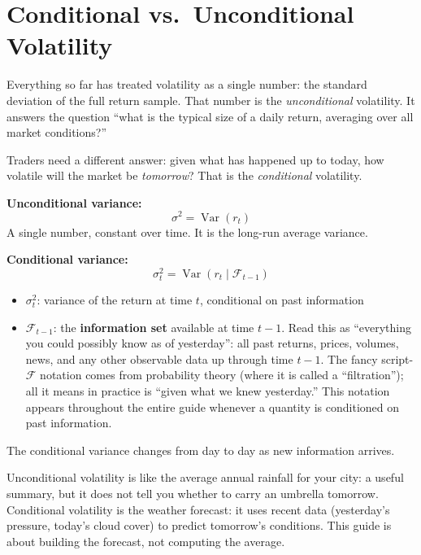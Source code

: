 \section{Conditional vs.\ Unconditional Volatility}
\label{sec:cond-uncond}

Everything so far has treated volatility as a single number: the standard deviation of the full return sample.
That number is the \emph{unconditional} volatility.
It answers the question ``what is the typical size of a daily return, averaging over all market conditions?''

Traders need a different answer: given what has happened up to today, how volatile will the market be \emph{tomorrow}?
That is the \emph{conditional} volatility.

\begin{definition}
\textbf{Unconditional variance:}
\begin{equation}
  \sigma^2 = \operatorname{Var}(r_t)
  \label{eq:uncond-var}
\end{equation}
A single number, constant over time. It is the long-run average variance.

\textbf{Conditional variance:}
\begin{equation}
  \sigma_t^2 = \operatorname{Var}(r_t \mid \mathcal{F}_{t-1})
  \label{eq:cond-var}
\end{equation}
\begin{itemize}[nosep]
  \item $\sigma_t^2$: variance of the return at time $t$, conditional on past information
  \item $\mathcal{F}_{t-1}$: the \textbf{information set} available at time $t-1$.
  Read this as ``everything you could possibly know as of yesterday'': all past returns, prices, volumes, news, and any other observable data up through time $t-1$.
  The fancy script-$\mathcal{F}$ notation comes from probability theory (where it is called a ``filtration''); all it means in practice is ``given what we knew yesterday.''
  This notation appears throughout the entire guide whenever a quantity is conditioned on past information.
\end{itemize}
The conditional variance changes from day to day as new information arrives.
\end{definition}

\begin{intuition}
Unconditional volatility is like the average annual rainfall for your city: a useful summary, but it does not tell you whether to carry an umbrella tomorrow.
Conditional volatility is the weather forecast: it uses recent data (yesterday's pressure, today's cloud cover) to predict tomorrow's conditions.
This guide is about building the forecast, not computing the average.
\end{intuition}

